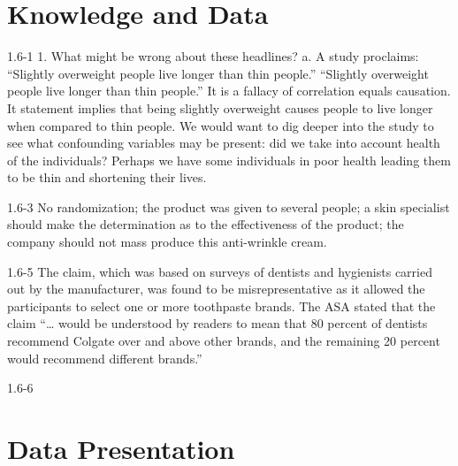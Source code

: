 \setcounter{chapter}{0}\chapter{Knowledge and Data}
\begin{exsol@solution}{1.6-1}
1.  What might be wrong about these headlines?
  a.	A study proclaims: ``Slightly overweight people live longer than thin people.'' ``Slightly overweight people live longer than thin people.''  It is a fallacy of correlation equals causation.  It statement implies that being slightly overweight causes people to live longer when compared to thin people.  We would want to dig deeper into the study to see what confounding variables may be present: did we take into account health of the individuals?  Perhaps we have some individuals in poor health leading them to be thin and shortening their lives.

\end{exsol@solution}
\begin{exsol@solution}{1.6-3}
No randomization; the product was given to several people; a skin specialist should make the determination as to the effectiveness of the product; the company should not mass produce this anti-wrinkle cream.

\end{exsol@solution}
\begin{exsol@solution}{1.6-5}
The claim, which was based on surveys of dentists and hygienists carried out by the manufacturer, was found to be misrepresentative as it allowed the participants to select one or more toothpaste brands. The ASA stated that the claim ``… would be understood by readers to mean that 80 percent of dentists recommend Colgate over and above other brands, and the remaining 20 percent would recommend different brands.''

\end{exsol@solution}
\begin{exsol@solution}{1.6-6}
\end{exsol@solution}
\setcounter{chapter}{1}\chapter{Data Presentation}
